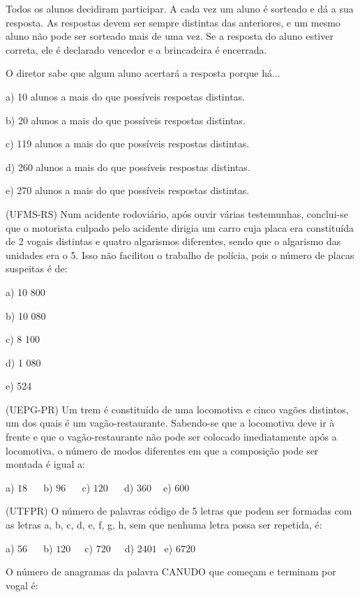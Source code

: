 \begin{multicols*}{2}
		      Todos os alunos decidiram participar. A cada vez um aluno é sorteado e dá a sua resposta. As respostas devem ser sempre distintas das anteriores, e um mesmo aluno não pode ser sorteado mais de uma vez. Se a resposta do aluno estiver correta, ele é declarado vencedor e a brincadeira é encerrada.

		      O diretor sabe que algum aluno acertará a resposta porque há...

		      a) 10 alunos a mais do que possíveis respostas distintas.

		      b) 20 alunos a mais do que possíveis respostas distintas.

		      c) 119 alunos a mais do que possíveis respostas distintas.

		      d) 260 alunos a mais do que possíveis respostas distintas.

		      e) 270 alunos a mais do que possíveis respostas distintas.

		\execnum (UFMS-RS) Num acidente rodoviário, após ouvir várias testemunhas, conclui-se que o motorista culpado pelo acidente dirigia um carro cuja placa era constituída de 2 vogais distintas e quatro algarismos diferentes, sendo que o algarismo das unidades era o 5. Isso não facilitou o trabalho de polícia, pois o número de placas suspeitas é de:

		      a) 10 800

		      b) 10 080

		      c) 8 100

		      d) 1 080

		      e) 524

		\execnum (UEPG-PR) Um trem é constituído de uma locomotiva e cinco vagões distintos, um dos quais é um vagão-restaurante. Sabendo-se que a locomotiva deve ir à frente e que o vagão-restaurante não pode ser colocado imediatamente após a locomotiva, o número de modos diferentes em que a composição pode ser montada é igual a:

		      a) $18 \ \ \ \ \ \ $ b) $96 \ \ \ \ \ \ $ c) $120 \ \ \ \ \ \ $ d) $360 \ \ \ \ $ e) $600 \ \ $

		\execnum (UTFPR) O número de palavras código de 5 letras que podem ser formadas com as letras a, b, c, d, e, f, g, h, sem que nenhuma letra possa ser repetida, é:

		      a) $56 \ \ \ \ \ \ $ b) $120 \ \ \ \ \ $ c) $720 \ \ \ \ \ $ d) $2401 \ \ $ e) $6720 $

		\execnum O número de anagramas da palavra CANUDO que começam e terminam por vogal é:


\end{multicols*}
